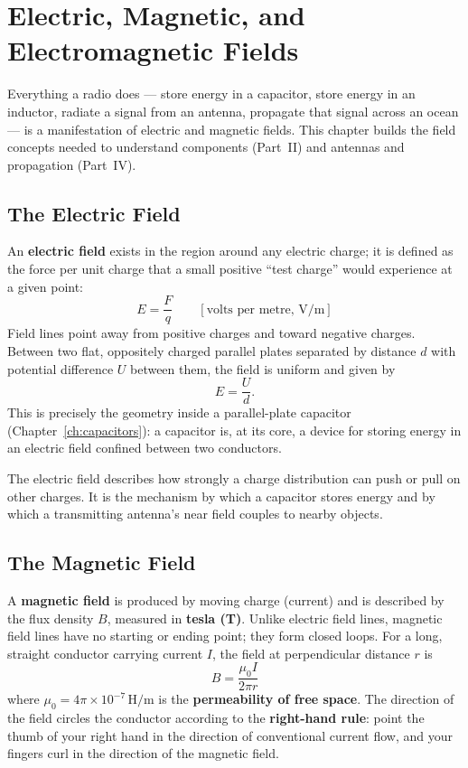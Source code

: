 \chapter{Electric, Magnetic, and Electromagnetic Fields}
\label{ch:fields}

Everything a radio does --- store energy in a capacitor, store energy in
an inductor, radiate a signal from an antenna, propagate that signal
across an ocean --- is a manifestation of electric and magnetic fields.
This chapter builds the field concepts needed to understand components
(Part~II) and antennas and propagation (Part~IV).

\section{The Electric Field}

An \textbf{electric field} exists in the region around any electric
charge; it is defined as the force per unit charge that a small positive
``test charge'' would experience at a given point:
\[
E = \frac{F}{q} \qquad [\text{volts per metre, V/m}]
\]
Field lines point away from positive charges and toward negative charges.
Between two flat, oppositely charged parallel plates separated by
distance $d$ with potential difference $U$ between them, the field is
uniform and given by
\[
E = \frac{U}{d}.
\]
This is precisely the geometry inside a parallel-plate capacitor
(Chapter~\ref{ch:capacitors}): a capacitor is, at its core, a device for
storing energy in an electric field confined between two conductors.

\begin{keyidea}
The electric field describes how strongly a charge distribution can push
or pull on other charges. It is the mechanism by which a capacitor stores
energy and by which a transmitting antenna's near field couples to
nearby objects.
\end{keyidea}

\section{The Magnetic Field}

A \textbf{magnetic field} is produced by moving charge (current) and is
described by the flux density $B$, measured in \textbf{tesla (T)}. Unlike
electric field lines, magnetic field lines have no starting or ending
point; they form closed loops. For a long, straight conductor carrying
current $I$, the field at perpendicular distance $r$ is
\[
B = \frac{\mu_0 I}{2\pi r}
\]
where $\mu_0 = 4\pi \times 10^{-7}\,\text{H/m}$ is the \textbf{permeability
of free space}. The direction of the field circles the conductor
according to the \textbf{right-hand rule}: point the thumb of your right
hand in the direction of conventional current flow, and your fingers curl
in the direction of the magnetic field.

